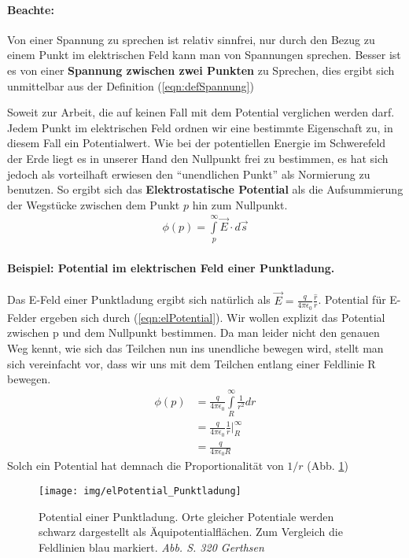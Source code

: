 \paragraph*{Beachte:}Von einer Spannung zu sprechen ist relativ sinnfrei, nur durch den Bezug zu einem Punkt im elektrischen Feld kann man von Spannungen sprechen. Besser ist es von einer \textbf{Spannung zwischen zwei Punkten}  zu Sprechen, dies ergibt sich unmittelbar aus der Definition (\ref{eqn:defSpannung})


Soweit zur Arbeit, die auf keinen Fall mit dem Potential verglichen werden darf. \\ Jedem Punkt im elektrischen Feld ordnen wir eine bestimmte Eigenschaft zu, in diesem Fall ein Potentialwert. Wie bei der potentiellen Energie im Schwerefeld der Erde liegt es in unserer Hand den Nullpunkt frei zu bestimmen, es hat sich jedoch als vorteilhaft erwiesen den "`unendlichen Punkt"' als Normierung zu benutzen. So ergibt sich das \textbf{Elektrostatische Potential} als die Aufsummierung der Wegstücke zwischen dem Punkt $p$ hin zum Nullpunkt.\begin{align}
\boxed{\phi \left( p\right) = \int \limits_p^\infty \vec{E} \cdot d\vec{s}} \label{eqn:elPotential}
\end{align}
\paragraph*{Beispiel: Potential im elektrischen Feld einer Punktladung.} Das E-Feld einer Punktladung ergibt sich natürlich als $\vec{E} = \frac{q}{4\pi\epsilon_0} \frac{\hat{r}}{r}$. Potential für E-Felder ergeben sich durch (\ref{eqn:elPotential}). Wir wollen explizit das Potential zwischen p und dem Nullpunkt bestimmen. Da man leider nicht den genauen Weg kennt, wie sich das Teilchen nun ins unendliche bewegen wird, stellt man sich vereinfacht vor, dass wir uns mit dem Teilchen entlang einer Feldlinie R bewegen.\begin{align*}
\phi \left( p\right) 	&= \frac{q}{4\pi\epsilon_0} \int \limits_R^\infty \frac{1}{r^2} dr \\
						&= \frac{q}{4\pi\epsilon_0} \frac{1}{r}\bigg|_R^\infty \\
						&= \frac{q}{4\pi\epsilon_0 R} 
\end{align*} Solch ein Potential hat demnach die Proportionalität von $1/r$ (Abb. \ref{pic:Potential Punktladung})
\begin{figure}[htp]\begin{center}
\texttt{[image: img/elPotential\_Punktladung]}\end{center}
\caption{Potential einer Punktladung. Orte gleicher Potentiale werden schwarz dargestellt als Äquipotentialflächen. Zum Vergleich die Feldlinien blau markiert. \textit{Abb. S. 320 Gerthsen}}
\label{pic:Potential Punktladung}
\end{figure}
